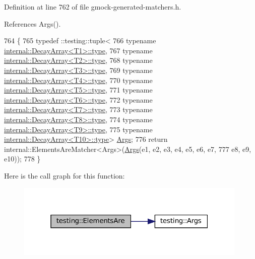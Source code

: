 Definition at line 762 of file gmock-\/generated-\/matchers.\+h.



References Args().


\begin{DoxyCode}
764                     \{
765   typedef ::testing::tuple<
766       \textcolor{keyword}{typename} \hyperlink{namespacegenerate__debs_a50bc9a7ecac9584553e089a448bcde58}{internal::DecayArray<T1>::type},
767       \textcolor{keyword}{typename} \hyperlink{namespacegenerate__debs_a50bc9a7ecac9584553e089a448bcde58}{internal::DecayArray<T2>::type},
768       \textcolor{keyword}{typename} \hyperlink{namespacegenerate__debs_a50bc9a7ecac9584553e089a448bcde58}{internal::DecayArray<T3>::type},
769       \textcolor{keyword}{typename} \hyperlink{namespacegenerate__debs_a50bc9a7ecac9584553e089a448bcde58}{internal::DecayArray<T4>::type},
770       \textcolor{keyword}{typename} \hyperlink{namespacegenerate__debs_a50bc9a7ecac9584553e089a448bcde58}{internal::DecayArray<T5>::type},
771       \textcolor{keyword}{typename} \hyperlink{namespacegenerate__debs_a50bc9a7ecac9584553e089a448bcde58}{internal::DecayArray<T6>::type},
772       \textcolor{keyword}{typename} \hyperlink{namespacegenerate__debs_a50bc9a7ecac9584553e089a448bcde58}{internal::DecayArray<T7>::type},
773       \textcolor{keyword}{typename} \hyperlink{namespacegenerate__debs_a50bc9a7ecac9584553e089a448bcde58}{internal::DecayArray<T8>::type},
774       \textcolor{keyword}{typename} \hyperlink{namespacegenerate__debs_a50bc9a7ecac9584553e089a448bcde58}{internal::DecayArray<T9>::type},
775       \textcolor{keyword}{typename} \hyperlink{namespacegenerate__debs_a50bc9a7ecac9584553e089a448bcde58}{internal::DecayArray<T10>::type}> 
      \hyperlink{namespacetesting_a09ac462e8d6ed468cbfaa9c767aee0aa}{Args};
776   \textcolor{keywordflow}{return} internal::ElementsAreMatcher<Args>(\hyperlink{namespacetesting_a09ac462e8d6ed468cbfaa9c767aee0aa}{Args}(e1, e2, e3, e4, e5, e6, e7,
777       e8, e9, e10));
778 \}
\end{DoxyCode}
Here is the call graph for this function\+:
\nopagebreak
\begin{figure}[H]
\begin{center}
\leavevmode
\includegraphics[width=313pt]{namespacetesting_a047f5f5a28c156a70002668323009ae9_cgraph}
\end{center}
\end{figure}
\mbox{\label{namespacetesting_ae2eee06e7ddbf5f5372fd24372e9703f}} 
